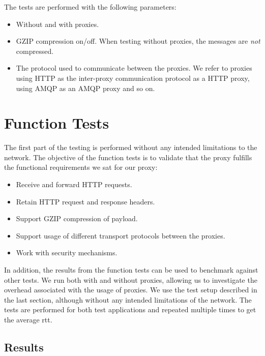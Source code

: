 The tests are performed with the following parameters:

\begin{itemize}

    \item Without and with proxies.

    \item GZIP compression on/off. When testing without proxies, the messages
    are \textit{not} compressed.

    \item The protocol used to communicate between the proxies. We refer to
    proxies using HTTP as the inter-proxy communication protocol as a HTTP
    proxy, using AMQP as an AMQP proxy and so on.

\end{itemize}



\section{Function Tests}

The first part of the testing is performed without any intended limitations to
the network. The objective of the function tests is to validate that the proxy
fulfills the functional requirements we sat for our proxy:

\begin{itemize}
    \item Receive and forward HTTP requests.
    \item Retain HTTP request and response headers.
    \item Support GZIP compression of payload.
    \item Support usage of different transport protocols between the proxies.
    \item Work with security mechanisms.
\end{itemize}

 In addition, the results from the function tests can be used to benchmark
 against other tests. We run both with and without proxies, allowing us to
 investigate the overhead associated with the usage of proxies. We use the test
 setup described in the last section, although without any intended limitations
 of the network. The tests are performed for both test applications and repeated
 multiple times to get the average \gls{rtt}.

\subsection{Results}

